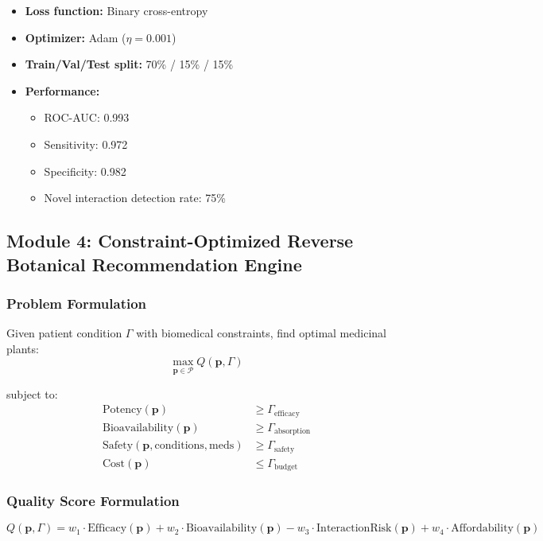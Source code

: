 \documentclass[11pt,a4paper]{article}
\begin{document}
\begin{itemize}
    \item \textbf{Loss function:} Binary cross-entropy
    \item \textbf{Optimizer:} Adam ($\eta = 0.001$)
    \item \textbf{Train/Val/Test split:} 70\% / 15\% / 15\%
    \item \textbf{Performance:} 
    \begin{itemize}
        \item ROC-AUC: 0.993
        \item Sensitivity: 0.972
        \item Specificity: 0.982
        \item Novel interaction detection rate: 75\%
    \end{itemize}
\end{itemize}

\subsection{Module 4: Constraint-Optimized Reverse Botanical Recommendation Engine}

\subsubsection{Problem Formulation}

Given patient condition $\Gamma$ with biomedical constraints, find optimal medicinal plants:
\[
\max_{\mathbf{p} \in \mathcal{P}} Q(\mathbf{p}, \Gamma)
\]

subject to:
\begin{align}
\text{Potency}(\mathbf{p}) &\geq \Gamma_{\text{efficacy}} \\
\text{Bioavailability}(\mathbf{p}) &\geq \Gamma_{\text{absorption}} \\
\text{Safety}(\mathbf{p}, \text{conditions}, \text{meds}) &\geq \Gamma_{\text{safety}} \\
\text{Cost}(\mathbf{p}) &\leq \Gamma_{\text{budget}}
\end{align}

\subsubsection{Quality Score Formulation}

\[
Q(\mathbf{p}, \Gamma) = w_1 \cdot \text{Efficacy}(\mathbf{p}) + w_2 \cdot \text{Bioavailability}(\mathbf{p}) - w_3 \cdot \text{InteractionRisk}(\mathbf{p}) + w_4 \cdot \text{Affordability}(\mathbf{p})
\]
\end{document}
